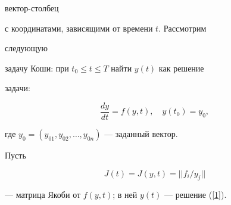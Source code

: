 вектор-столбец


с координатами, зависящими от времени $t$. Рассмотрим


следующую


задачу Коши: при $t_0\le t \le T$ найти $y(t)$ как решение


задачи:


\begin{equation}


\frac{dy}{dt}=f(y,t),\quad y(t_0)=y_0,


\label{1}


\end{equation}


где $y_0=(y_{01},y_{02},\dotsc,y_{0n})$ --- заданный вектор.





Пусть


\begin{equation}


J(t)=J(y,t)=||f_i /y_j||


\label{2}


\end{equation}


--- матрица Якоби от $f(y,t)$; в ней $y(t)$ --- решение (\ref{1}).





